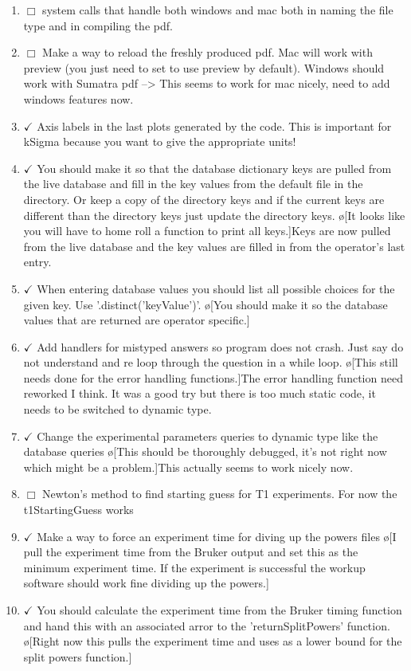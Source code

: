 \documentclass[10pt]{book}
\begin{document}
\begin{enumerate}
    \item $\Box$ system calls that handle both windows and mac both in naming the file type and in compiling the pdf.
    \item $\Box$ Make a way to reload the freshly produced pdf. Mac will work with preview (you just need to set to use preview by default). Windows should work with Sumatra pdf --> This seems to work for mac nicely, need to add windows features now.
    \item $\checkmark$ Axis labels in the last plots generated by the code. This is important for kSigma because you want to give the appropriate units!
    \item $\checkmark$ You should make it so that the database dictionary keys are pulled from the live database and fill in the key values from the default file in the directory. Or keep a copy of the directory keys and if the current keys are different than the directory keys just update the directory keys. \o[It looks like you will have to home roll a function to print all keys.]{Keys are now pulled from the live database and the key values are filled in from the operator's last entry.}
    \item $\checkmark$ When entering database values you should list all possible choices for the given key. Use '.distinct('keyValue')'. \o[You should make it so the database values that are returned are operator specific.]{}
    \item $\checkmark$ Add handlers for mistyped answers so program does not crash. Just say do not understand and re loop through the question in a while loop. \o[This still needs done for the error handling functions.]{The error handling function need reworked I think. It was a good try but there is too much static code, it needs to be switched to dynamic type.}
    \item $\checkmark$ Change the experimental parameters queries to dynamic type like the database queries \o[This should be thoroughly debugged, it's not right now which might be a problem.]{This actually seems to work nicely now.}
    \item $\Box$ Newton's method to find starting guess for T1 experiments. For now the t1StartingGuess works 
    \item $\checkmark$ Make a way to force an experiment time for diving up the powers files \o[I pull the experiment time from the Bruker output and set this as the minimum experiment time. If the experiment is successful the workup software should work fine dividing up the powers.]{}
    \item $\checkmark$ You should calculate the experiment time from the Bruker timing function and hand this with an associated arror to the 'returnSplitPowers' function. \o[Right now this pulls the experiment time and uses as a lower bound for the split powers function.]{}
\end{enumerate}
\end{document}
